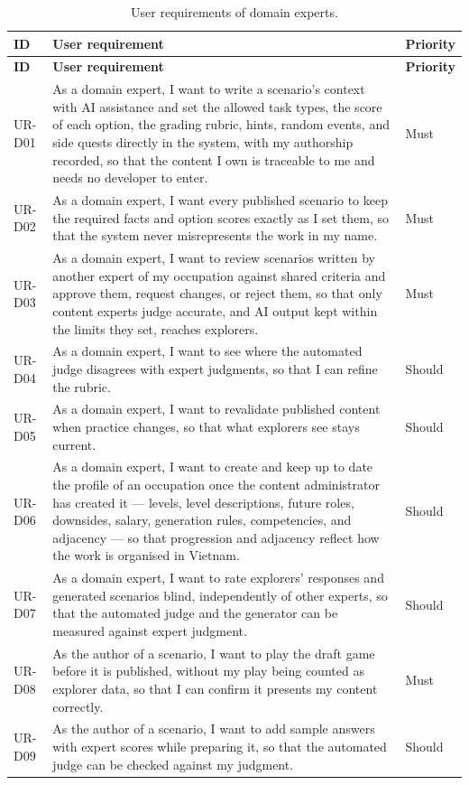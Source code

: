 {\small
\begin{longtable}{|>{\raggedright\arraybackslash}p{}|>{\raggedright\arraybackslash}p{}|>{\raggedright\arraybackslash}p{}|}
\caption{User requirements of domain experts.} \\
\hline
\textbf{ID} & \textbf{User requirement} & \textbf{Priority} \\ \hline
\endfirsthead
\hline
\textbf{ID} & \textbf{User requirement} & \textbf{Priority} \\ \hline
\endhead
UR-D01 & As a domain expert, I want to write a scenario's context with AI assistance and set the allowed task types, the score of each option, the grading rubric, hints, random events, and side quests directly in the system, with my authorship recorded, so that the content I own is traceable to me and needs no developer to enter. & Must \\ \hline
UR-D02 & As a domain expert, I want every published scenario to keep the required facts and option scores exactly as I set them, so that the system never misrepresents the work in my name. & Must \\ \hline
UR-D03 & As a domain expert, I want to review scenarios written by another expert of my occupation against shared criteria and approve them, request changes, or reject them, so that only content experts judge accurate, and AI output kept within the limits they set, reaches explorers. & Must \\ \hline
UR-D04 & As a domain expert, I want to see where the automated judge disagrees with expert judgments, so that I can refine the rubric. & Should \\ \hline
UR-D05 & As a domain expert, I want to revalidate published content when practice changes, so that what explorers see stays current. & Should \\ \hline
UR-D06 & As a domain expert, I want to create and keep up to date the profile of an occupation once the content administrator has created it --- levels, level descriptions, future roles, downsides, salary, generation rules, competencies, and adjacency --- so that progression and adjacency reflect how the work is organised in Vietnam. & Should \\ \hline
UR-D07 & As a domain expert, I want to rate explorers' responses and generated scenarios blind, independently of other experts, so that the automated judge and the generator can be measured against expert judgment. & Should \\ \hline
UR-D08 & As the author of a scenario, I want to play the draft game before it is published, without my play being counted as explorer data, so that I can confirm it presents my content correctly. & Must \\ \hline
UR-D09 & As the author of a scenario, I want to add sample answers with expert scores while preparing it, so that the automated judge can be checked against my judgment. & Should \\ \hline
\end{longtable}
}

